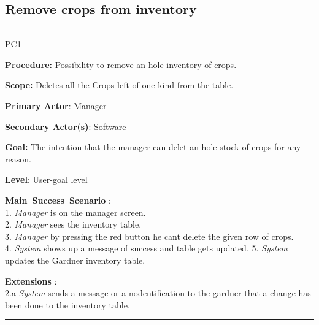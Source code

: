 \subsection{Remove crops from inventory}

\vspace{0.5cm}
\hrule
\hfill \break
\begin{lyxlist}{PC1}
\small{
\item [\textbf{Procedure:}] Possibility to remove an hole inventory of crops.
\item [\textbf{Scope:}] Deletes all the Crops left of one kind from the table.
\item [\textbf{Primary Actor}:] Manager
\item [\textbf{Secondary Actor(s)}:] Software
\item [\textbf{Goal:}] The intention that the manager can delet an hole stock of
crops for any reason.
\item [\textbf{Level}:] User-goal level
\item [\textbf{Main~Success~Scenario}]:\\
1. \emph{Manager} is on the manager screen. \\
2. \emph{Manager} sees the inventory table.\\
3. \emph{Manager} by pressing the red button he cant delete the given row of
crops.\\
4. \emph{System} shows up a message of success and table gets updated.
5. \emph{System} updates the Gardner inventory table.
\item [\textbf{Extensions}]:\\
2.a  \emph{System} sends a message or a nodentification to the gardner that a
change has been done to the inventory table.\\
}
\end{lyxlist}
\hrule
\vspace{0.5cm}




\break


